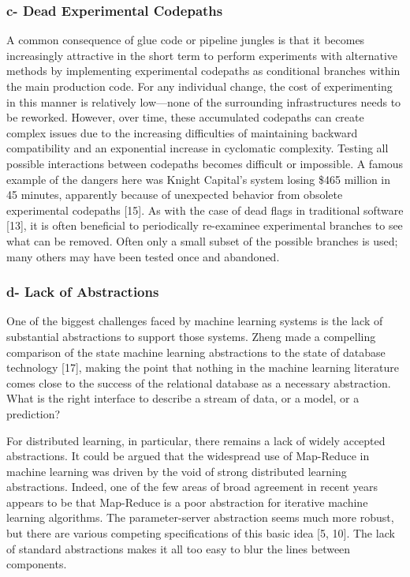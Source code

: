 \documentclass[]{article}
\begin{document}
\subsubsection{c- Dead Experimental
Codepaths}\label{c--dead-experimental-codepaths}

A common consequence of glue code or pipeline jungles is that it becomes
increasingly attractive in the short term to perform experiments with
alternative methods by implementing experimental codepaths as
conditional branches within the main production code. For any individual
change, the cost of experimenting in this manner is relatively
low---none of the surrounding infrastructures needs to be reworked.
However, over time, these accumulated codepaths can create complex
issues due to the increasing difficulties of maintaining backward
compatibility and an exponential increase in cyclomatic complexity.
Testing all possible interactions between codepaths becomes difficult or
impossible. A famous example of the dangers here was Knight Capital's
system losing \$465 million in 45 minutes, apparently because of
unexpected behavior from obsolete experimental codepaths {[}15{]}. As
with the case of dead flags in traditional software {[}13{]}, it is
often beneficial to periodically re-examinee experimental branches to
see what can be removed. Often only a small subset of the possible
branches is used; many others may have been tested once and abandoned.

\subsubsection{d- Lack of Abstractions}\label{d--lack-of-abstractions}

One of the biggest challenges faced by machine learning systems is the
lack of substantial abstractions to support those systems. Zheng made a
compelling comparison of the state machine learning abstractions to the
state of database technology {[}17{]}, making the point that nothing in
the machine learning literature comes close to the success of the
relational database as a necessary abstraction. What is the right
interface to describe a stream of data, or a model, or a prediction?

For distributed learning, in particular, there remains a lack of widely
accepted abstractions. It could be argued that the widespread use of
Map-Reduce in machine learning was driven by the void of strong
distributed learning abstractions. Indeed, one of the few areas of broad
agreement in recent years appears to be that Map-Reduce is a poor
abstraction for iterative machine learning algorithms. The
parameter-server abstraction seems much more robust, but there are
various competing specifications of this basic idea {[}5, 10{]}. The
lack of standard abstractions makes it all too easy to blur the lines
between components.
\end{document}
